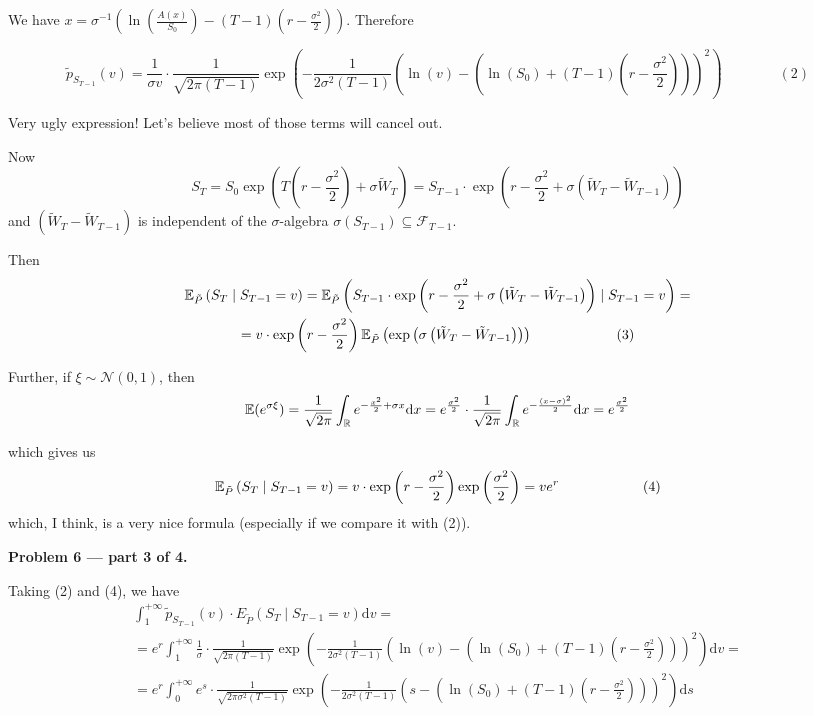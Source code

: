 \documentclass[12pt, a4paper]{article}
\newcommand{\RR}{\mathbb{R}}
\newcommand{\cF}{\mathcal{F}}
\newcommand{\cN}{\mathcal{N}}
\newcommand{\dx}{\mathrm{d}x}
\newcommand{\dv}{\mathrm{d}v}
\begin{document}
We have $x = \sigma^{-1}\left(\ln\left(\frac{ A(x)}{ S_{0}}\right) - (T-1)\left(r - \frac{ \sigma^{2}}{ 2}\right)\right)$. Therefore

\[
 \tilde{p}_{S_{T-1}}\left(v\right) = \frac{ 1}{ \sigma v}\cdot \frac{ 1}{ \sqrt{2\pi (T-1)}}\exp\left(-\frac{ 1}{ 2\sigma^{2}(T-1)}\left(\ln(v) - \left(\ln(S_{0}) + (T-1)\left(r - \frac{ \sigma^{2}}{ 2}\right)\right)\right)^{2}\right) \qquad \qquad (2)
\]

Very ugly expression! Let's believe most of those terms will cancel out.

Now
\[
S_{T} = S_{0}\exp \left(T\left(r - \frac{ \sigma^{2}}{ 2}\right) + \sigma \tilde{W}_{T}\right) = S_{T-1}\cdot \exp\left(r - \frac{ \sigma^{2}}{ 2} + \sigma \left(\tilde{W}_{T} - \tilde{W}_{T-1}\right)\right)
\]
and $\left(\tilde{W}_{T} - \tilde{W}_{T-1}\right)$ is independent of the $\sigma$-algebra $\sigma(S_{T-1})\subseteq \cF_{T-1}$.


Then
\begin{multline}
 \operatorname{\mathbb{E}}_{\tilde{P}}\left(S_{T} \mid S_{T-1} = v\right) =  \operatorname{\mathbb{E}}_{\tilde{P}}\left(S_{T-1}\cdot \exp\left(r - \frac{ \sigma^{2}}{ 2} + \sigma \left(\tilde{W}_{T} - \tilde{W}_{T-1}\right)\right) \mid S_{T-1} = v\right) =\\
 = v\cdot\exp\left(r - \frac{ \sigma^{2}}{ 2}\right) \operatorname{\mathbb{E}}_{\tilde{P}}\left(\exp\left(\sigma \left(\tilde{W}_{T} - \tilde{W}_{T-1}\right)\right)\right)\qquad\qquad\qquad (3)
\end{multline}


Further, if $\xi \sim \cN(0,1)$, then
\[
\E(e^{\sigma\xi}) = \frac{ 1}{ \sqrt{2\pi}}\int_{\RR}e^{-\frac{x^{2}}{2} + \sigma x}\dx = e^{\frac{\sigma^{2}}{2}}\cdot\frac{ 1}{ \sqrt{2\pi}}\int_{\RR}e^{-\frac{(x-\sigma)^{2}}{2}}\dx = e^{\frac{\sigma^{2}}{2}}
\]

which gives us
\[
\operatorname{\mathbb{E}}_{\tilde{P}}\left(S_{T} \mid S_{T-1} = v\right) = v\cdot\exp\left(r - \frac{ \sigma^{2}}{ 2}\right)\exp\left(\frac{ \sigma^{2}}{ 2}\right) = ve^{r}\qquad\qquad\qquad (4)
\]
which, I think, is a very nice formula (especially if we compare it with (2)).


\textbf{Problem 6 — part 3 of 4.}


Taking (2) and (4), we have
\begin{multline}
 \int_1^{+\infty}\tilde{p}_{S_{T-1}}(v)\cdot E_{\tilde{P}}\left(S_{T} \mid S_{T-1} = v\right)\dv =\\
 = e^{r}\int_1^{+\infty}\frac{ 1}{ \sigma}\cdot \frac{ 1}{ \sqrt{2\pi (T-1)}}\exp\left(-\frac{ 1}{ 2\sigma^{2}(T-1)}\left(\ln(v) - \left(\ln(S_{0}) + (T-1)\left(r - \frac{ \sigma^{2}}{ 2}\right)\right)\right)^{2}\right)\dv = \\
 = e^{r}\int_0^{+\infty}e^{s}\cdot \frac{ 1}{ \sqrt{2\pi\sigma^{2} (T-1)}}\exp\left(-\frac{ 1}{ 2\sigma^{2}(T-1)}\left(s - \left(\ln(S_{0}) + (T-1)\left(r - \frac{ \sigma^{2}}{ 2}\right)\right)\right)^{2}\right)\mathrm{d}s
\end{multline}
\end{document}
